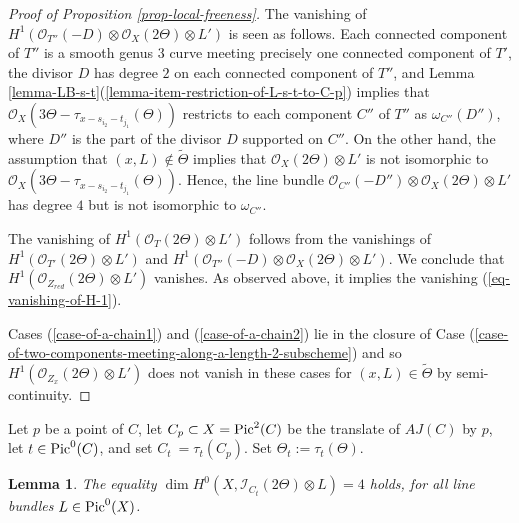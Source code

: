 \documentclass[12pt]{amsart}
\numberwithin{equation}{subsection}
\theoremstyle{plain}
\newtheorem{lem}[thm]{Lemma}
\theoremstyle{definition}
\newcommand{\StructureSheaf}[1]{{\mathcal O}_{#1}}
\newcommand{\Pic}{{\rm Pic}}
\newcommand{\Ideal}[1]{{\mathcal I}_{#1}}
\begin{document}
\begin{proof}[Proof of Proposition \ref{prop-local-freeness}]
The vanishing of $H^1(\StructureSheaf{T''}(-D)\otimes\StructureSheaf{X}(2\Theta)\otimes L')$ is seen as follows.
Each connected component of $T''$ is a smooth genus $3$ curve meeting precisely one connected component of $T'$, 
the divisor $D$ has degree $2$ on each connected component of $T''$, and 
Lemma \ref{lemma-LB-s-t}(\ref{lemma-item-restriction-of-L-s-t-to-C-p}) implies that $\StructureSheaf{X}(3\Theta-\tau_{x-s_{i_2}-t_{j_1}}(\Theta))$
restricts to each component $C''$ of $T''$ as $\omega_{C''}(D'')$, where $D''$ is the part of the divisor $D$ supported on $C''$.
On the other hand, the assumption that $(x,L)\not\in \tilde{\Theta}$ implies that $\StructureSheaf{X}(2\Theta)\otimes L'$ is not isomorphic to 
$\StructureSheaf{X}(3\Theta-\tau_{x-s_{i_2}-t_{j_1}}(\Theta))$. Hence, the line bundle $\StructureSheaf{C''}(-D'')\otimes\StructureSheaf{X}(2\Theta)\otimes L'$
has degree $4$ but is not isomorphic to $\omega_{C''}$.

The vanishing of $H^1(\StructureSheaf{T}(2\Theta)\otimes L')$ follows from the vanishings of $H^1(\StructureSheaf{T'}(2\Theta)\otimes L')$ and $H^1(\StructureSheaf{T''}(-D)\otimes\StructureSheaf{X}(2\Theta)\otimes L')$. We conclude that $H^1(\StructureSheaf{Z_{red}}(2\Theta)\otimes L')$ vanishes.
As observed above, it implies the vanishing (\ref{eq-vanishing-of-H-1}).


Cases (\ref{case-of-a-chain1}) and (\ref{case-of-a-chain2}) lie in the closure of 
Case (\ref{case-of-two-components-meeting-along-a-length-2-subscheme}) and so $H^1(\StructureSheaf{Z_x}(2\Theta)\otimes L')$ does not vanish in these cases for $(x,L)\in\tilde{\Theta}$ 
by semi-continuity. 
\end{proof}





Let $p$ be a point of $C$, let $C_p\subset X=\Pic^2(C)$ be the translate of $AJ(C)$ by $p$, let $t\in\Pic^0(C)$, and set $C_t\:=\tau_t(C_p)$.  Set $\Theta_t:=\tau_t(\Theta)$.

\begin{lem}
\label{lemma-global-sections-of-ideal-I-C-2Theta}
The equality $\dim H^0(X,\Ideal{C_t}(2\Theta)\otimes L)=4$ holds, for all line bundles $L\in\Pic^0(X)$.
\end{lem}
\end{document}
